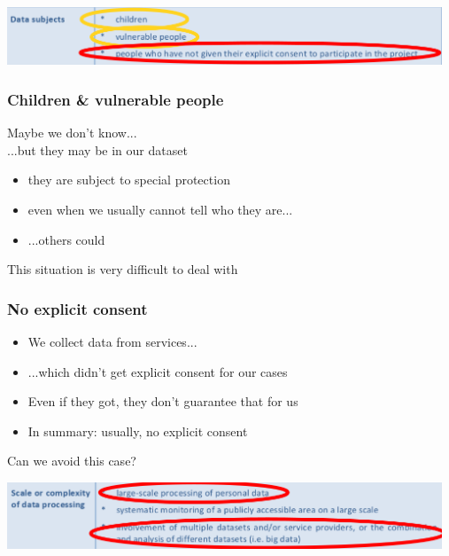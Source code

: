\documentclass[17pt,aspectratio=169,hyperref={pdfusetitle,colorlinks,allcolors=olive}]{beamer}
\begin{document}
\begin{frame}[fragile]
  \vspace{-1.6cm}
  \begin{center}
    \includegraphics[width=13cm]{figs/gdpr-higher-risks-annotated-subjects}
  \end{center}
\end{frame}

\begin{frame}[fragile]
  \frametitle{Children \& vulnerable people}

  Maybe we don't know...\\
  ...but they may be in our dataset\\
  
  \begin{itemize}
  \item they are subject to special protection
  \item even when we usually cannot tell who they are...
  \item ...others could
  \end{itemize}

  This situation is very difficult to deal with
\end{frame}

\begin{frame}[fragile]
  \frametitle{No explicit consent}

  \begin{itemize}
  \item We collect data from services...
  \item ...which didn't get explicit consent for our cases
  \item Even if they got, they don't guarantee that for us
  \item In summary: usually, no explicit consent
  \end{itemize}

  \begin{flushright}
    Can we avoid this case?
  \end{flushright}
\end{frame}

\begin{frame}[fragile]
  \vspace{-1.6cm}
  \begin{center}
    \includegraphics[width=13cm]{figs/gdpr-higher-risks-annotated-scale}
  \end{center}
\end{frame}
\end{document}
